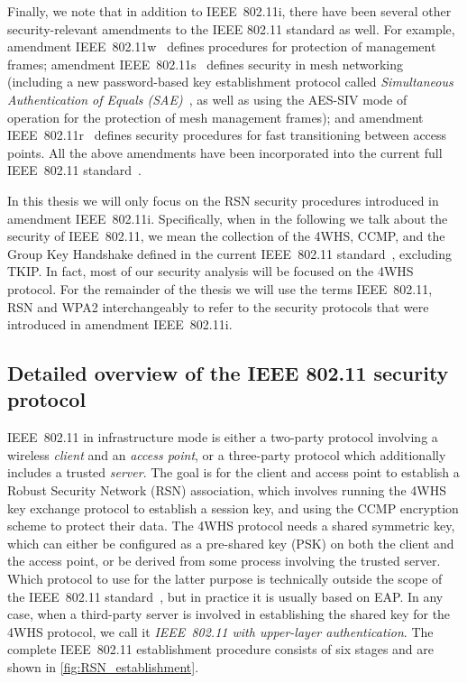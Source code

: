 Finally, we note that in addition to IEEE~802.11i,
there have been several other security-relevant amendments to the IEEE 802.11 standard as well.
For example,
amendment IEEE~802.11w~\cite{IEEE:2009:802.11w} defines procedures for protection of management frames;
amendment IEEE~802.11s~\cite{IEEE:2011:802.11s} defines security in mesh networking 
(including a new password-based key establishment protocol called \emph{Simultaneous Authentication of Equals (SAE)}~\cite{Harkins:2008:SAE},
as well as using the AES-SIV mode of operation \cite{IETF:RFC5297:AES-SIV} for the protection of mesh management frames);
and amendment IEEE~802.11r~\cite{IEEE:2008:802.11r} defines security procedures for fast transitioning between access points.    
All the above amendments have been incorporated into the current full IEEE~802.11 standard~\cite{IEEE:2012:802.11}. 


In this thesis we will only focus on the RSN security procedures introduced in amendment IEEE~802.11i.
Specifically, 
when in the following we talk about the security of IEEE~802.11,
we mean the collection of the 4WHS, CCMP, and the Group Key Handshake  defined in the current IEEE~802.11 standard~\cite{IEEE:2012:802.11},
excluding TKIP.
In fact, most of our security analysis will be focused on the 4WHS protocol.
For the remainder of the thesis we will use the terms IEEE~802.11, RSN and WPA2 interchangeably to refer to the security protocols that were introduced in amendment IEEE~802.11i.  



\subsection{Detailed overview of the IEEE 802.11 security protocol}\label{sec:description:EAP_&_802.11:802.11:security_protocol}

IEEE~802.11 in infrastructure mode is either a two-party protocol involving a wireless \emph{client} and an \emph{access point},
or a three-party protocol which additionally includes a trusted \emph{server}.
The goal is for the client and access point to establish a Robust Security Network (RSN) association,
which involves running the 4WHS key exchange protocol to establish a session key,
and using the CCMP encryption scheme to protect their data.
The 4WHS protocol needs a shared symmetric key,
which can either be configured as a pre-shared key (PSK) on both the client and the access point,
or  be derived from some process involving the trusted server.
Which protocol to use for the latter purpose is technically outside the scope of the IEEE~802.11 standard~\cite{IEEE:2012:802.11},
but in practice it is usually based on EAP.
In any case,
when a third-party server is involved in establishing the shared key for the 4WHS protocol,
we call it \emph{IEEE~802.11 with upper-layer authentication}.
The complete IEEE~802.11 establishment procedure consists of six stages and are shown in \cref{fig:RSN_establishment}. 



